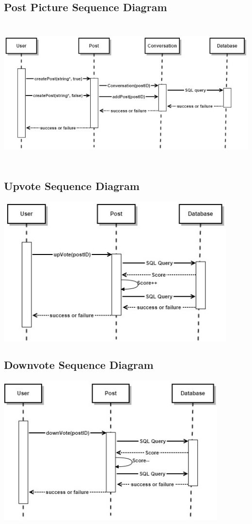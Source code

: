 \documentclass[11pt]{scrartcl}
\begin{document}
    \subsection{Post Picture Sequence Diagram}
        \centerline{\includegraphics[width=\textwidth,height=3in,keepaspectratio]{diagrams/post-SEQ.png}}

\newpage

    \subsection{Upvote Sequence Diagram}
        \centerline{\includegraphics[width=\textwidth,height=3in,keepaspectratio]{diagrams/upvote-SEQ.png}}

    \subsection{Downvote Sequence Diagram}
        \centerline{\includegraphics[width=\textwidth,height=3in,keepaspectratio]{diagrams/downvote-SEQ.png}}
\end{document}
